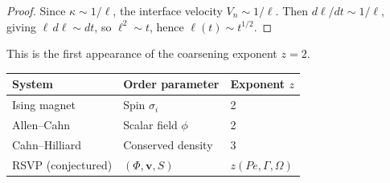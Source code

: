 \begin{proof}
  Since $\kappa \sim 1/\ell$, the interface velocity
  $V_n \sim 1/\ell$.
  Then $d\ell/dt \sim 1/\ell$, giving $\ell\, d\ell \sim dt$,
  so $\ell^2 \sim t$, hence $\ell(t) \sim t^{1/2}$.
\end{proof}

This is the first appearance of the coarsening exponent $z = 2$.

\begin{CrossDomain}
  \begin{center}
  \begin{tabular}{@{}lll@{}}
    \toprule
    \textbf{System} & \textbf{Order parameter} & \textbf{Exponent $z$} \\
    \midrule
    Ising magnet & Spin $\sigma_i$ & 2 \\
    Allen--Cahn & Scalar field $\phi$ & 2 \\
    Cahn--Hilliard & Conserved density & 3 \\
    RSVP (conjectured) & $(\Phi,\mathbf{v},S)$ & $z(Pe,\Gamma,\Omega)$ \\
    \bottomrule
  \end{tabular}
  \end{center}
\end{CrossDomain}


